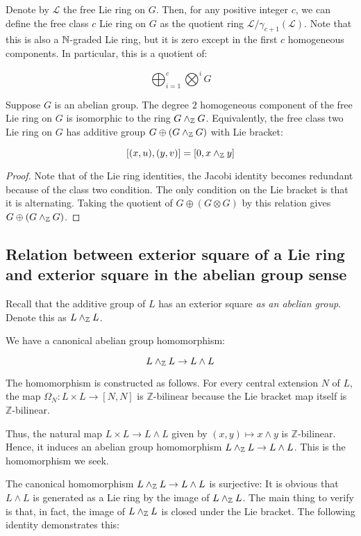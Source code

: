 Denote by $\mathcal{L}$ the free Lie ring on $G$. Then, for any
positive integer $c$, we can define the free class $c$ Lie ring on $G$
as the quotient ring $\mathcal{L}/\gamma_{c+1}(\mathcal{L})$. Note that this is
also a $\mathbb{N}$-graded Lie ring, but it is zero except in the first $c$
homogeneous components. In particular, this is a quotient of:

$$\bigoplus_{i=1}^c \bigotimes^i G$$

\begin{lemma}
  Suppose $G$ is an abelian group. The degree $2$ homogeneous
  component of the free Lie ring on $G$ is isomorphic to the ring $G
  \wedge_{\mathbb{Z}} G$. Equivalently, the free class two Lie ring on $G$ has
  additive group $G \oplus (G \wedge_{\mathbb{Z}} G)$ with Lie bracket:

  $$[(x,u),(y,v)] = [0,x \wedge_{\mathbb{Z}} y]$$
\end{lemma}

\begin{proof}
  Note that of the Lie ring identities, the Jacobi identity becomes
  redundant because of the class two condition. The only condition on
  the Lie bracket is that it is alternating. Taking the quotient of $G
  \oplus (G \otimes G)$ by this relation gives $G \oplus (G \wedge_{\mathbb{Z}}
  G)$.
\end{proof}

\subsection{Relation between exterior square of a Lie ring and exterior square in the abelian group sense}\label{sec:exteriorsquare-abelian-lie}

Recall that the additive group of $L$ has an exterior square {\em as
  an abelian group}. Denote this as $L \wedge_{\mathbb{Z}} L$.

We have a canonical abelian group homomorphism:

$$L \wedge_{\mathbb{Z}} L \to L \wedge L$$

The homomorphism is constructed as follows. For every central
extension $N$ of $L$, the map $\Omega_N:L \times L \to [N,N]$ is
$\mathbb{Z}$-bilinear because the Lie bracket map itself is
$\mathbb{Z}$-bilinear.

Thus, the natural map $L \times L \to L \wedge L$ given by $(x,y)
\mapsto x \wedge y$ is $\mathbb{Z}$-bilinear. Hence, it induces an
abelian group homomorphism $L \wedge_{\mathbb{Z}} L \to L \wedge L$. This is the
homomorphism we seek.

The canonical homomorphism $L \wedge_{\mathbb{Z}} L \to L \wedge L$ is
surjective: It is obvious that $L \wedge L$ is generated as a Lie ring
by the image of $L \wedge_{\mathbb{Z}} L$. The main thing to verify is that, in
fact, the image of $L \wedge_{\mathbb{Z}} L$ is closed under the Lie
bracket. The following identity demonstrates this:

